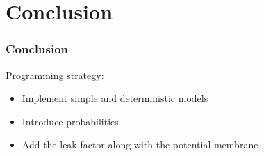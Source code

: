 \section{Conclusion}
\begin{frame}
  \frametitle{Conclusion}

  Programming strategy:

  \begin{itemize}
    \item Implement simple and deterministic models
    \item Introduce probabilities
    \item Add the leak factor along with the potential membrane
  \end{itemize}

  \mysep{}


\end{frame}